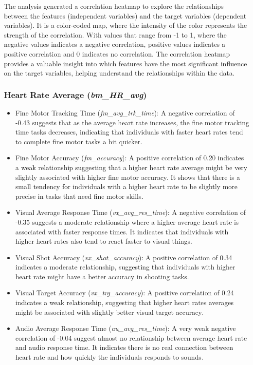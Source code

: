 The analysis generated a correlation heatmap to explore the relationships between the features (independent variables) and the target variables (dependent variables).
It is a color-coded map, where the intensity of the color represents the strength of the correlation. With values that range from -1 to 1, where the negative values indicates a negative
correlation, positive values indicates a positive correlation and 0 indicates no correlation. The correlation heatmap provides a valuable insight into which features have the most 
significant influence on the target variables, helping understand the relationships within the data.

\subsubsection*{Heart Rate Average (\textit{bm\_HR\_avg})}
\begin{itemize}
    \item Fine Motor Tracking Time (\textit{fm\_avg\_trk\_time}): A negative correlation of \\ -0.43 suggests that as the average heart rate increases, the fine motor
    tracking time tasks decreases, indicating that individuals with faster heart rates tend to complete fine motor tasks a bit quicker.
    \item Fine Motor Accuracy (\textit{fm\_accuracy}): A positive correlation of 0.20 indicates a weak relationship suggesting that a higher heart rate average might be very 
    slightly associated with higher fine motor accuracy. It shows that there is a small tendency for individuals with a higher heart rate to be slightly more precise
    in tasks that need fine motor skills.
    \item Visual Average Response Time (\textit{vx\_avg\_res\_time}): A negative correlation of -0.35 suggests a moderate relationship where a higher average heart rate
    is associated with faster response times. It indicates that individuals with higher heart rates also tend to react faster to visual things.
    \item Visual Shot Accuracy (\textit{vx\_shot\_accuracy}): A positive correlation of 0.34 indicates a moderate relationship, suggesting that individuals with higher heart
    rate might have a better accuracy in shooting tasks.
    \item Visual Target Accuracy (\textit{vx\_trg\_accuracy}): A positive correlation of 0.24 indicates a weak relationship, suggesting that higher heart rates averages might
    be associated with slightly better visual target accuracy.
    \item Audio Average Response Time (\textit{au\_avg\_res\_time}): A very weak negative correlation of -0.04 suggest almost no relationship between average heart rate
    and audio response time. It indicates there is no real connection between heart rate and how quickly the individuals responds to sounds.
\end{itemize}

